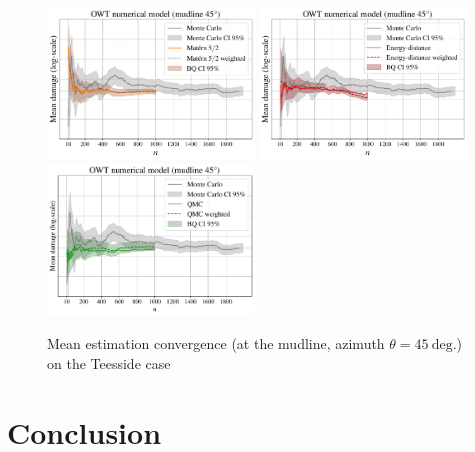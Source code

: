 \begin{figure}[!h]
\begin{center}
    \includegraphics[width=0.49\textwidth]{part2/figures/DCE/teesside/log_convergence_MaternNode1_45.pdf}
    \includegraphics[width=0.49\textwidth]{part2/figures/DCE/teesside/log_convergence_EnergyNode1_45.pdf}
    \includegraphics[width=0.49\textwidth]{part2/figures/DCE/teesside/log_convergence_QMCNode1_45.pdf}
\end{center}
\caption{Mean estimation convergence (at the mudline, azimuth $\theta=45~\mathrm{deg.}$) on the Teesside case} \label{fig:convergence_teesside}
\end{figure}


\section{Conclusion}\label{sec5}

